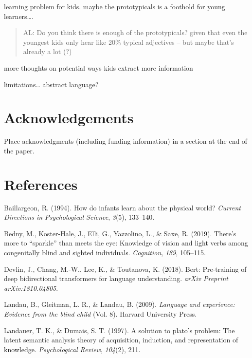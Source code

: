 \documentclass[10pt, letterpaper]{article}
\begin{document}
learning problem for kids. maybe the prototypicals is a foothold for
young learners\ldots{}.

\begin{quote}
AL: Do you think there is enough of the prototypicals? given that even
the youngest kids only hear like 20\% typical adjectives -- but maybe
that's already a lot (?)
\end{quote}

more thoughts on potential ways kids extract more information

limitations\ldots{} abstract language?

\hypertarget{acknowledgements}{%
\section{Acknowledgements}\label{acknowledgements}}

Place acknowledgments (including funding information) in a section at
the end of the paper.

\hypertarget{references}{%
\section{References}\label{references}}

\setlength{\parindent}{-0.1in} 
\setlength{\leftskip}{0.125in}

\noindent

\hypertarget{refs}{}
\leavevmode\hypertarget{ref-baillargeon1994}{}%
Baillargeon, R. (1994). How do infants learn about the physical world?
\emph{Current Directions in Psychological Science}, \emph{3}(5),
133--140.

\leavevmode\hypertarget{ref-bedny2019}{}%
Bedny, M., Koster-Hale, J., Elli, G., Yazzolino, L., \& Saxe, R. (2019).
There's more to ``sparkle'' than meets the eye: Knowledge of vision and
light verbs among congenitally blind and sighted individuals.
\emph{Cognition}, \emph{189}, 105--115.

\leavevmode\hypertarget{ref-devlin2018}{}%
Devlin, J., Chang, M.-W., Lee, K., \& Toutanova, K. (2018). Bert:
Pre-training of deep bidirectional transformers for language
understanding. \emph{arXiv Preprint arXiv:1810.04805}.

\leavevmode\hypertarget{ref-landau2009}{}%
Landau, B., Gleitman, L. R., \& Landau, B. (2009). \emph{Language and
experience: Evidence from the blind child} (Vol. 8). Harvard University
Press.

\leavevmode\hypertarget{ref-landauer1997}{}%
Landauer, T. K., \& Dumais, S. T. (1997). A solution to plato's problem:
The latent semantic analysis theory of acquisition, induction, and
representation of knowledge. \emph{Psychological Review}, \emph{104}(2),
211.
\end{document}
